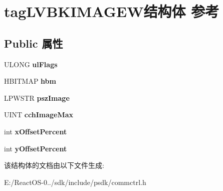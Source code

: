 \hypertarget{structtag_l_v_b_k_i_m_a_g_e_w}{}\section{tag\+L\+V\+B\+K\+I\+M\+A\+G\+E\+W结构体 参考}
\label{structtag_l_v_b_k_i_m_a_g_e_w}
\subsection*{Public 属性}
\begin{DoxyCompactItemize}
\item 
\mbox{\label{structtag_l_v_b_k_i_m_a_g_e_w_a04f0b42aaf4a30307572bd8a616b2c57}} 
U\+L\+O\+NG {\bfseries ul\+Flags}
\item 
\mbox{\label{structtag_l_v_b_k_i_m_a_g_e_w_a81fcfee221115c8e43b3426c45b37941}} 
H\+B\+I\+T\+M\+AP {\bfseries hbm}
\item 
\mbox{\label{structtag_l_v_b_k_i_m_a_g_e_w_a403dc79a1253bcf84ccb4dd816f977eb}} 
L\+P\+W\+S\+TR {\bfseries psz\+Image}
\item 
\mbox{\label{structtag_l_v_b_k_i_m_a_g_e_w_ab22178d2d35a94cb7adb66e8e364b851}} 
U\+I\+NT {\bfseries cch\+Image\+Max}
\item 
\mbox{\label{structtag_l_v_b_k_i_m_a_g_e_w_a07c76652f92c36a60782ae8570524e81}} 
int {\bfseries x\+Offset\+Percent}
\item 
\mbox{\label{structtag_l_v_b_k_i_m_a_g_e_w_aeb9c463ae72ab684b01bde04895987bd}} 
int {\bfseries y\+Offset\+Percent}
\end{DoxyCompactItemize}


该结构体的文档由以下文件生成\+:\begin{DoxyCompactItemize}
\item 
E\+:/\+React\+O\+S-\/0../sdk/include/psdk/commctrl.\+h\end{DoxyCompactItemize}

